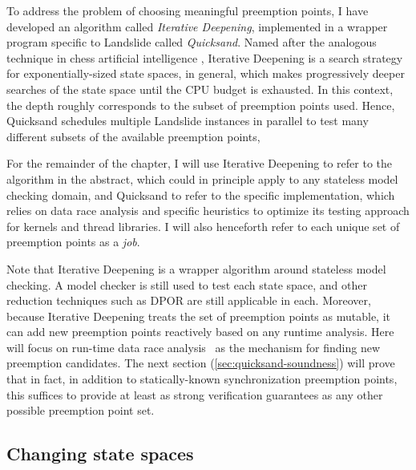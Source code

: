 To address the problem of choosing meaningful preemption points,
I have developed an algorithm called {\em Iterative Deepening},
implemented in a wrapper program specific to Landslide called {\em Quicksand}.
Named after the analogous technique in chess artificial intelligence \cite{iterative-deepening-chess-ai},
Iterative Deepening
is a search strategy
for exponentially-sized state spaces, in general,
which
makes progressively deeper searches of the state space until the CPU budget is exhausted.
In this context, the depth roughly corresponds to the subset of preemption points used.
Hence, Quicksand
schedules multiple Landslide instances in parallel to
test many different subsets of the available preemption points,

For the remainder of the chapter, I will use Iterative Deepening to refer to the algorithm in the abstract,
which could in principle apply to any stateless model checking domain,
and Quicksand to refer to the specific implementation,
which relies on data race analysis and specific heuristics to optimize its testing approach
for kernels and thread libraries.
I will also henceforth refer to each unique set of preemption points as a {\em job}.



Note that Iterative Deepening is a wrapper algorithm around stateless model checking.
A model checker is still used to test each state space, and other reduction techniques such as DPOR
are still applicable in each.
Moreover, because Iterative Deepening treats the set of preemption points as mutable,
it can add new preemption points reactively based on any runtime analysis.
Here
will focus on run-time data race analysis~\cite{tsan,fasttrack} as the mechanism for finding new preemption candidates.
The next section (\cref{sec:quicksand-soundness})
will prove that in fact,
in addition to statically-known synchronization preemption points,
this suffices to provide at least as strong verification guarantees as any other possible preemption point set.


\subsection{Changing state spaces}

